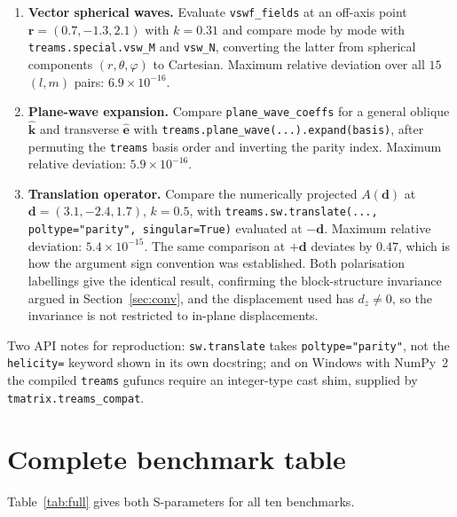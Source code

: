 \documentclass[11pt,a4paper]{article}
\newcommand{\rvec}{\ensuremath{\mathbf{r}}}
\newcommand{\code}[1]{\texttt{\small #1}}
\theoremstyle{plain}
\theoremstyle{definition}
\begin{document}
\begin{enumerate}[leftmargin=*,itemsep=2pt]
\item \textbf{Vector spherical waves.} Evaluate \code{vswf\_fields} at an
      off-axis point $\rvec = (0.7, -1.3, 2.1)$ with $k = 0.31$ and compare mode
      by mode with \code{treams.special.vsw\_M} and \code{vsw\_N}, converting the
      latter from spherical components $(r,\theta,\varphi)$ to Cartesian. Maximum
      relative deviation over all $15$ $(l,m)$ pairs: $6.9\times10^{-16}$.
\item \textbf{Plane-wave expansion.} Compare \code{plane\_wave\_coeffs} for a
      general oblique $\hat{\mathbf{k}}$ and transverse $\hat{\mathbf{e}}$ with
      \code{treams.plane\_wave(...).expand(basis)}, after permuting the
      \texttt{treams} basis order and inverting the parity index. Maximum
      relative deviation: $5.9\times10^{-16}$.
\item \textbf{Translation operator.} Compare the numerically projected
      $A(\mathbf{d})$ at $\mathbf{d} = (3.1, -2.4, 1.7)$, $k = 0.5$, with
      \code{treams.sw.translate(..., poltype="parity", singular=True)} evaluated
      at $-\mathbf{d}$. Maximum relative deviation: $5.4\times10^{-15}$. The same
      comparison at $+\mathbf{d}$ deviates by $0.47$, which is how the argument
      sign convention was established. Both polarisation labellings give the
      identical result, confirming the block-structure invariance argued in
      Section~\ref{sec:conv}, and the displacement used has $d_z \neq 0$, so the
      invariance is not restricted to in-plane displacements.
\end{enumerate}

\noindent
Two API notes for reproduction: \code{sw.translate} takes \code{poltype="parity"},
not the \code{helicity=} keyword shown in its own docstring; and on Windows with
NumPy~2 the compiled \texttt{treams} gufuncs require an integer-type cast shim,
supplied by \code{tmatrix.treams\_compat}.

\section{Complete benchmark table}
\label{app:full}

Table~\ref{tab:full} gives both S-parameters for all ten benchmarks.
\end{document}
